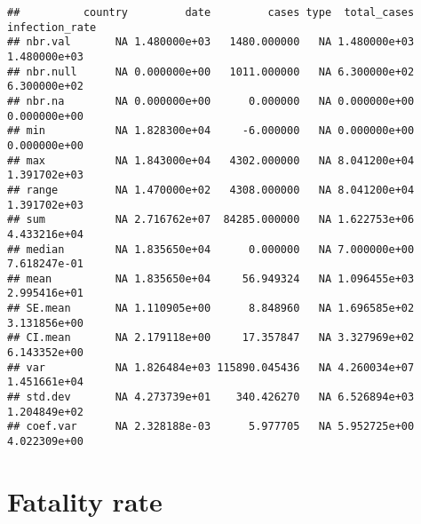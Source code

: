 \documentclass[
]{article}
\begin{document}
\begin{verbatim}
##          country         date         cases type  total_cases infection_rate
## nbr.val       NA 1.480000e+03   1480.000000   NA 1.480000e+03   1.480000e+03
## nbr.null      NA 0.000000e+00   1011.000000   NA 6.300000e+02   6.300000e+02
## nbr.na        NA 0.000000e+00      0.000000   NA 0.000000e+00   0.000000e+00
## min           NA 1.828300e+04     -6.000000   NA 0.000000e+00   0.000000e+00
## max           NA 1.843000e+04   4302.000000   NA 8.041200e+04   1.391702e+03
## range         NA 1.470000e+02   4308.000000   NA 8.041200e+04   1.391702e+03
## sum           NA 2.716762e+07  84285.000000   NA 1.622753e+06   4.433216e+04
## median        NA 1.835650e+04      0.000000   NA 7.000000e+00   7.618247e-01
## mean          NA 1.835650e+04     56.949324   NA 1.096455e+03   2.995416e+01
## SE.mean       NA 1.110905e+00      8.848960   NA 1.696585e+02   3.131856e+00
## CI.mean       NA 2.179118e+00     17.357847   NA 3.327969e+02   6.143352e+00
## var           NA 1.826484e+03 115890.045436   NA 4.260034e+07   1.451661e+04
## std.dev       NA 4.273739e+01    340.426270   NA 6.526894e+03   1.204849e+02
## coef.var      NA 2.328188e-03      5.977705   NA 5.952725e+00   4.022309e+00
\end{verbatim}

\hypertarget{fatality-rate}{%
\section{Fatality rate}\label{fatality-rate}}
\end{document}
